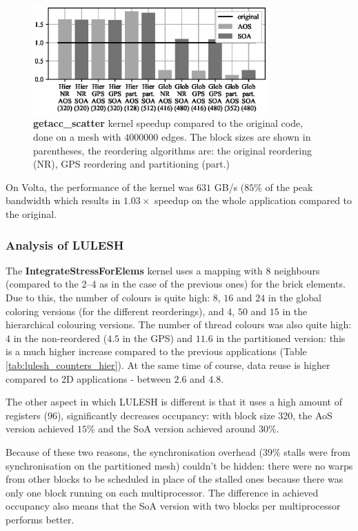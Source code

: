 \begin{figure}[Htbp]
  \centering
  \includegraphics[width=9cm]{fig/bookleaf_speedup.eps}
  \caption{\textbf{getacc\_scatter} kernel speedup compared to the original
  code, done on a mesh with $4000000$ edges. The block sizes are shown in
  parentheses, the reordering algorithms are: the original reordering (NR), GPS
  reordering and partitioning (part.)}
  \label{fig:bookleaf_speedup}
\end{figure}

On Volta, the performance of the kernel was $631$ GB/s ($85\%$ of the peak
bandwidth which results in $1.03\times$ speedup on the whole application compared
to the original.


\subsubsection{Analysis of LULESH}\label{sec:analysis-of-lulesh}


The \textbf{IntegrateStressForElems} kernel uses a mapping with 8 neighbours
(compared to the 2--4 as in the case of the previous ones) for the brick
elements. Due to this, the number of colours is quite high: $8$, $16$ and $24$
in the global coloring versions (for the different reorderings), and $4$, $50$
and $15$ in the hierarchical colouring versions. The number of thread colours
was also quite high: $4$ in the non-reordered ($4.5$ in the GPS) and $11.6$ in
the partitioned version: this is a much higher increase compared to the previous
applications (Table \ref{tab:lulesh_counters_hier}). At the same time of course,
data reuse is higher compared to 2D applications - between $2.6$ and $4.8$.

The other aspect in which LULESH is different is that it uses a high amount of
registers ($96$), significantly decreases occupancy: with block size 320, the
AoS version achieved $15\%$ and the SoA version achieved around $30\%$.

Because of these two reasons, the synchronisation overhead ($39\%$ stalls were
from synchronisation on the partitioned mesh) couldn't be hidden: there were no
warps from other blocks to be scheduled in place of the stalled ones because
there was only one block running on each multiprocessor. The difference in
achieved occupancy also means that the SoA version with two blocks per
multiprocessor performs better.

